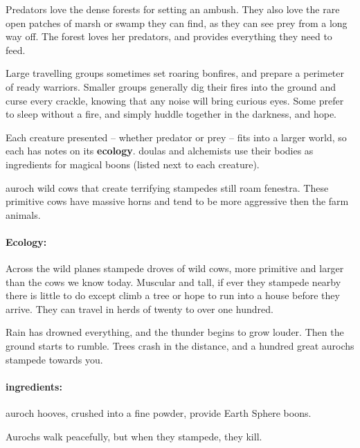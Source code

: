 \begin{multicols}{2}

\noindent
Predators love the dense forests for setting an ambush.
They also love the rare open patches of marsh or swamp they can find, as they can see prey from a long way off.
The forest loves her predators, and provides everything they need to feed.

Large travelling groups sometimes set roaring bonfires, and prepare a perimeter of ready warriors.
Smaller groups generally dig their fires into the ground and curse every crackle, knowing that any noise will bring curious eyes.
Some prefer to sleep without a fire, and simply huddle together in the darkness, and hope.

Each creature presented -- whether predator or prey -- fits into a larger world, so each has notes on its \textbf{ecology}.
\Glspl{doula} and alchemists use their bodies as \glspl{ingredient} for magical \glspl{boon} (listed next to each creature).

  {auroch}%
  {wild cows that create terrifying stampedes}%
still roam \gls{fenestra}.
These primitive cows have massive horns and tend to be more aggressive then the farm animals.


\paragraph{Ecology:} Across the wild planes stampede droves of wild cows, more primitive and larger than the cows we know today.
Muscular and tall, if ever they stampede nearby there is little to do except climb a tree or hope to run into a house before they arrive.
They can travel in herds of twenty to over one hundred.

\begin{boxtext}
  Rain has drowned everything, and the thunder begins to grow louder.
  Then the ground starts to rumble.
  Trees crash in the distance, and a hundred great aurochs stampede towards you.
\end{boxtext}

\paragraph{\Glspl{ingredient}:}
auroch hooves, crushed into a fine powder, provide Earth Sphere \glspl{boon}.

\showEnc
Aurochs walk peacefully, but when they stampede, they kill.


\end{multicols}
